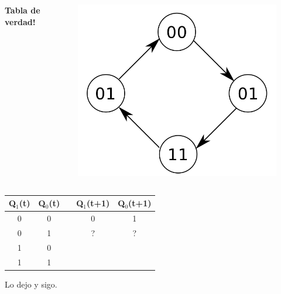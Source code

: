 \documentclass[10pt]{beamer}
\begin{document}
\begin{frame}
{\begin{columns}
            \textbf{Tabla de verdad!}
              \begin{figure}[h!]
                  \centering
                  \includegraphics[scale=0.2]{ej1.png}
              \end{figure}
      \end{columns}
      \begin{table}[h!]
      \begin{tabular}{|c|c|c|c|c|}
      \hline
      Q$_1$(t) & Q$_0$(t) &  & Q$_1$(t+1) & Q$_0$(t+1) \\ \hline
      0        & 0        &  & 0          & 1          \\ \hline
      0        & 1        &  & ?          & ?          \\ \hline
      1        & 0        &  &           &           \\ \hline
      1        & 1        &  &           &           \\ \hline
      \end{tabular}
      \end{table}
    Lo dejo y sigo.}
\end{frame}
\end{document}
